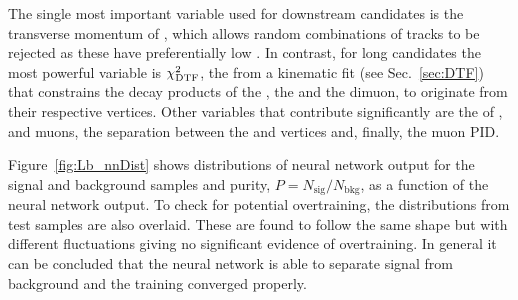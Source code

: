 The single most important variable used for downstream candidates is the transverse momentum of
\Lz, which allows random combinations of tracks to be rejected as these have preferentially low \pt.
In contrast, for long candidates the most powerful variable is $\chi^2_{\rm DTF}$, the \chisq from a kinematic 
fit (see Sec.~\ref{sec:DTF}) that constrains the decay products of the \Lb, the \Lz and the dimuon, to originate from their respective vertices. 
Other variables that contribute significantly are the \chisqip of \Lb, \Lz and muons,
the separation between the \Lb and \Lz vertices and, finally, the muon PID.

Figure~\ref{fig:Lb_nnDist} shows distributions of neural network output for the signal and background samples
and purity, $P=N_{\mathrm{sig}}/N_{\mathrm{bkg}}$, as a function of the neural network output.
To check for potential overtraining, the distributions from test samples are also overlaid. These are found to 
follow the same shape but with different fluctuations
giving no significant evidence of overtraining. In general it can be concluded that the neural network
is able to separate signal from background and the training converged properly.
%
